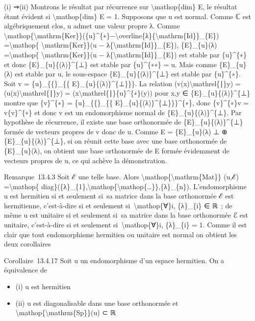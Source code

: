 \documentclass[]{article}
\begin{document}
(i) ⇒(ii) Montrons le résultat par récurrence sur
\textbackslash{}mathop\{dim\} E, le résultat étant évident si
\textbackslash{}mathop\{dim\} E = 1. Supposons que u est normal. Comme ℂ
est algébriquement clos, u admet une valeur propre λ. Comme
\textbackslash{}mathop\{\textbackslash{}mathrm\{Ker\}\}(\{u\}\^{}\{∗\}−\textbackslash{}overline\{λ\}\{\textbackslash{}mathrm\{Id\}\}\_\{E\})
=\textbackslash{}mathop\{ \textbackslash{}mathrm\{Ker\}\}(u −
λ\{\textbackslash{}mathrm\{Id\}\}\_\{E\}), \{E\}\_\{u\}(λ)
=\textbackslash{}mathop\{ \textbackslash{}mathrm\{Ker\}\}(u −
λ\{\textbackslash{}mathrm\{Id\}\}\_\{E\}) est stable par \{u\}\^{}\{∗\}
et donc \{E\}\_\{u\}\{(λ)\}\^{}\{⊥\} est stable par \{u\}\^{}\{∗∗\} = u.
Mais comme \{E\}\_\{u\}(λ) est stable par u, le sous-espace
\{E\}\_\{u\}\{(λ)\}\^{}\{⊥\} est stable par \{u\}\^{}\{∗\}. Soit v =
\{u\}\_\{\{\textbar{}\}\_\{\{ E\}\_\{u\}\{(λ)\}\^{}\{⊥\}\}\}. La
relation (v(x)\textbackslash{}mathrel\{∣\}y) =
(u(x)\textbackslash{}mathrel\{∣\}y) =
(x\textbackslash{}mathrel\{∣\}\{u\}\^{}\{∗\}(y)) pour x,y ∈
\{E\}\_\{u\}\{(λ)\}\^{}\{⊥\} montre que \{v\}\^{}\{∗\} =
\{u\}\_\{\{\textbar{}\}\_\{\{ E\}\_\{u\}\{(λ)\}\^{}\{⊥\}\}\}\^{}\{∗\},
donc \{v\}\^{}\{∗\}v = v\{v\}\^{}\{∗\} et donc v est un endomorphisme
normal de \{E\}\_\{u\}\{(λ)\}\^{}\{⊥\}. Par hypothèse de récurrence, il
existe une base orthonormée de \{E\}\_\{u\}\{(λ)\}\^{}\{⊥\} formée de
vecteurs propres de v donc de u. Comme E = \{E\}\_\{u\}(λ) ⊥ ⊕
\{E\}\_\{u\}\{(λ)\}\^{}\{⊥\}, si on réunit cette base avec une base
orthonormée de \{E\}\_\{u\}(λ), on obtient une base orthonormée de E
formée évidemment de vecteurs propres de u, ce qui achève la
démonstration.

Remarque~13.4.3 Soit ℰ une telle base. Alors
\textbackslash{}mathop\{\textbackslash{}mathrm\{Mat\}\} (u,ℰ)
=\textbackslash{}mathop\{
diag\}(\{λ\}\_\{1\},\textbackslash{}mathop\{\textbackslash{}mathop\{\ldots{}\}\},\{λ\}\_\{n\}).
L'endomorphisme u est hermitien si et seulement si~sa matrice dans la
base orthonormée ℰ est hermitienne, c'est-à-dire si et seulement
si~\textbackslash{}mathop\{∀\}i, \{λ\}\_\{i\} ∈ ℝ~; de même u est
unitaire si et seulement si~sa matrice dans la base orthonormée ℰ est
unitaire, c'est-à-dire si et seulement si~\textbackslash{}mathop\{∀\}i,
\textbar{}\{λ\}\_\{i\}\textbar{} = 1. Comme il est clair que tout
endomorphisme hermitien ou unitaire est normal on obtient les deux
corollaires

Corollaire~13.4.17 Soit u un endomorphisme d'un espace hermitien. On a
équivalence de

\begin{itemize}
\itemsep1pt\parskip0pt
\item
  (i) u est hermitien
\item
  (ii) u est diagonalisable dans une base orthonormée et
  \textbackslash{}mathop\{\textbackslash{}mathrm\{Sp\}\}(u) ⊂ ℝ
\end{itemize}
\end{document}
